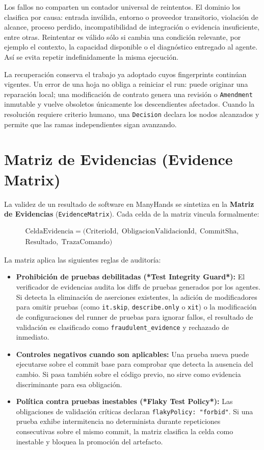 Los fallos no comparten un contador universal de reintentos. El dominio los
clasifica por causa: entrada inválida, entorno o proveedor transitorio, violación
de alcance, proceso perdido, incompatibilidad de integración o evidencia
insuficiente, entre otras. Reintentar es válido sólo si cambia una condición
relevante, por ejemplo el contexto, la capacidad disponible o el diagnóstico
entregado al agente. Así se evita repetir indefinidamente la misma ejecución.

La recuperación conserva el trabajo ya adoptado cuyos fingerprints continúan
vigentes. Un error de una hoja no obliga a reiniciar el run: puede originar una
reparación local; una modificación de contrato genera una revisión o
\texttt{Amendment} inmutable y vuelve obsoletos únicamente los descendientes
afectados. Cuando la resolución requiere criterio humano, una \texttt{Decision}
declara los nodos alcanzados y permite que las ramas independientes sigan
avanzando.

\section{Matriz de Evidencias (Evidence Matrix)}
\label{sec:matriz-evidencias}

La validez de un resultado de software en ManyHands se sintetiza en la \textbf{Matriz de Evidencias} (\texttt{EvidenceMatrix}). Cada celda de la matriz vincula formalmente:

\begin{multline}
\text{CeldaEvidencia} = \big(\text{CriterioId},\;
\text{ObligacionValidacionId},\; \text{CommitSha},\\
\text{Resultado},\; \text{TrazaComando}\big)
\label{eq:celda-evidencia}
\end{multline}

\noindent La matriz aplica las siguientes reglas de auditoría:

\begin{itemize}
  \item \textbf{Prohibición de pruebas debilitadas (*Test Integrity Guard*):} El verificador de evidencias audita los diffs de pruebas generados por los agentes. Si detecta la eliminación de aserciones existentes, la adición de modificadores para omitir pruebas (como \texttt{it.skip}, \texttt{describe.only} o \texttt{xit}) o la modificación de configuraciones del runner de pruebas para ignorar fallos, el resultado de validación es clasificado como \texttt{fraudulent\_evidence} y rechazado de inmediato.
  \item \textbf{Controles negativos cuando son aplicables:} Una prueba nueva puede ejecutarse sobre el commit base para comprobar que detecta la ausencia del cambio. Si pasa también sobre el código previo, no sirve como evidencia discriminante para esa obligación.
  \item \textbf{Política contra pruebas inestables (*Flaky Test Policy*):} Las obligaciones de validación críticas declaran \texttt{flakyPolicy: "forbid"}. Si una prueba exhibe intermitencia no determinista durante repeticiones consecutivas sobre el mismo commit, la matriz clasifica la celda como inestable y bloquea la promoción del artefacto.
\end{itemize}

